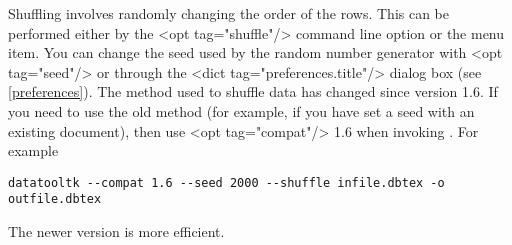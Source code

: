   Shuffling involves randomly changing the order of the rows. This can be
   performed either by the <opt tag="shuffle"/> command line option or
   the  menu item. You can change
   the seed used by the random number generator with
   <opt tag="seed"/> or through the 
   <dict tag="preferences.title"/> dialog box (see \autoref{preferences}).
   The method used to shuffle data has changed since version 1.6.
   If you need to use the old method (for example, if you
   have set a seed with an existing document), then use
   <opt tag="compat"/> 1.6 when invoking . For example

\begin{verbatim}
datatooltk --compat 1.6 --seed 2000 --shuffle infile.dbtex -o outfile.dbtex
\end{verbatim}
   The newer version is more efficient.
